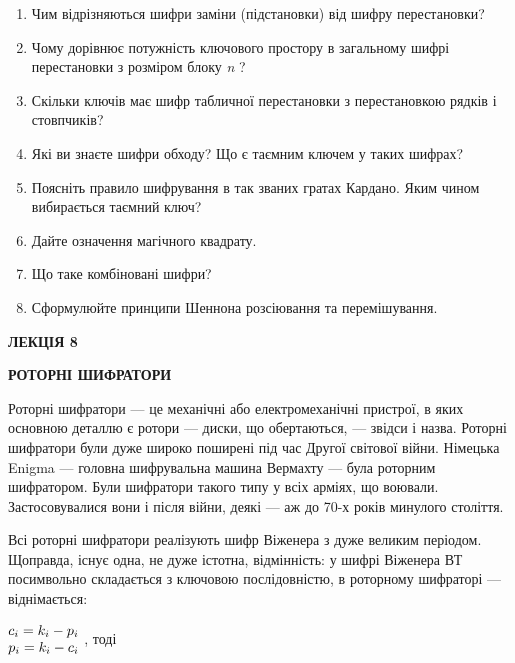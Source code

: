 \bigskip

\liststyleWWviiiNumxvii
\begin{enumerate}
\item Чим відрізняються шифри заміни (підстановки) від шифру перестановки?
\item Чому дорівнює потужність ключового простору в загальному шифрі
перестановки з розміром блоку \textit{n}\textit{ }?
\item Скільки ключів має шифр табличної перестановки з перестановкою рядків і
стовпчиків? 
\item Які ви знаєте шифри обходу? Що є таємним ключем у таких шифрах?
\item Поясніть правило шифрування в так званих гратах Кардано. Яким чином
вибирається таємний ключ?
\item Дайте означення магічного квадрату.
\item Що таке комбіновані шифри?
\item Сформулюйте принципи Шеннона розсіювання  та перемішування. 
\end{enumerate}

\bigskip


\bigskip


\bigskip


\bigskip


\bigskip

{\bfseries
ЛЕКЦІЯ  8}


\bigskip

{\centering\bfseries
РОТОРНІ  ШИФРАТОРИ
\par}


\bigskip


\bigskip

Роторні шифратори  ---  це механічні або електромеханічні пристрої, в яких
основною деталлю є ротори  ---  диски, що обертаються, ---  звідси і назва. Роторні
шифратори були дуже широко поширені під час Другої світової війни. Німецька
Enigma --- головна шифрувальна машина Вермахту --- була роторним шифратором. Були
шифратори такого типу у всіх арміях, що воювали. Застосовувалися вони і після
війни, деякі --- аж до 70-х років минулого століття.

Всі роторні шифратори реалізують шифр Віженера з дуже великим періодом.
Щоправда, існує одна, не дуже істотна, відмінність: у шифрі Віженера ВТ
посимвольно складається з ключовою послідовністю, в роторному шифраторі ---
віднімається:


\bigskip

{\centering
 $\begin{matrix}{c_{i}=k_{i}-p_{i}}\hfill\null
\\p_{i}=k_{i}-c_{i}\hfill\null \end{matrix}\hfill $  , тоді
\par}


